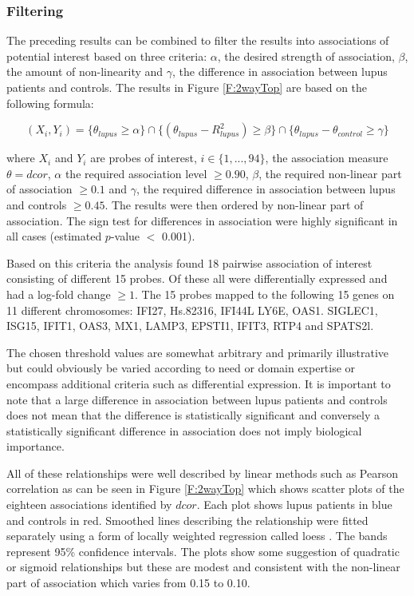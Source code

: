 \documentclass[a4paper, 12pt]{report}
\begin{document}
\subsubsection{Filtering}
The preceding results can be combined to filter the results into associations of potential interest based on three criteria: $\alpha$, the desired strength of association, $\beta$, the amount of non-linearity and $\gamma$, the difference in association between lupus patients and controls. The results in Figure \ref{F:2wayTop} are based on the following formula:

\[
(X_i, Y_i) = \{\theta_{lupus} \ge \alpha\} \cap \{(\theta_{lupus} - R^2_{lupus}) \ge \beta \} \cap \{\theta_{lupus} - \theta_{control} \ge \gamma \}
\]

where $X_i$ and $Y_i$ are probes of interest, $i \in \{1, ..., 94\}$, the association measure $\theta = dcor$, $\alpha$ the required association level $\ge 0.90$, $\beta$, the required non-linear part of association $\ge 0.1$ and $\gamma$, the required difference in association between lupus and controls $\ge 0.45$. The results were then ordered by non-linear part of association. The sign test for differences in association were highly significant in all cases (estimated $p$-value $<$ 0.001).

Based on this criteria the analysis found 18 pairwise association of interest consisting of different 15 probes. Of these all were differentially expressed and had a log-fold change $\ge 1$. The 15 probes mapped to the following 15 genes on 11 different chromosomes: IFI27,  Hs.82316, IFI44L   LY6E, OAS1. SIGLEC1, ISG15, IFIT1, OAS3, MX1, LAMP3, EPSTI1, IFIT3, RTP4  and SPATS2l.  

The chosen threshold values are somewhat arbitrary and primarily illustrative but could obviously be varied according to need or domain expertise or encompass additional criteria such as differential expression. It is important to note that a large difference in association  between lupus patients and controls does not mean that the difference is statistically significant and conversely a statistically significant difference in association does not imply biological importance. 
 
All of these relationships were well described by linear methods such as Pearson correlation as can be seen in Figure \ref{F:2wayTop} which shows scatter plots of the eighteen  associations identified by $dcor$. Each plot shows lupus patients in blue and controls in red. Smoothed lines describing the relationship were fitted separately using a form of locally weighted regression called loess \cite{MASS}. The bands represent 95\% confidence intervals. The plots show some suggestion of quadratic or sigmoid relationships but these are modest and consistent with the non-linear part of association which varies from 0.15 to 0.10. 
\end{document}
